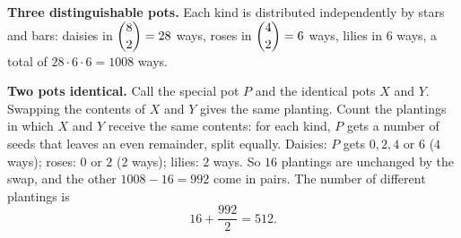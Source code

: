 \textbf{Three distinguishable pots.} Each kind is distributed independently by stars and bars: daisies in $\dbinom82=28$ ways, roses in $\dbinom42=6$ ways, lilies in $6$ ways, a total of $28\cdot6\cdot6=1008$ ways.

\textbf{Two pots identical.} Call the special pot $P$ and the identical pots $X$ and $Y$. Swapping the contents of $X$ and $Y$ gives the same planting. Count the plantings in which $X$ and $Y$ receive the same contents: for each kind, $P$ gets a number of seeds that leaves an even remainder, split equally. Daisies: $P$ gets $0,2,4$ or $6$ ($4$ ways); roses: $0$ or $2$ ($2$ ways); lilies: $2$ ways. So $16$ plantings are unchanged by the swap, and the other $1008-16=992$ come in pairs. The number of different plantings is
\[
16+\dfrac{992}{2}=\boxed{512}.
\]

